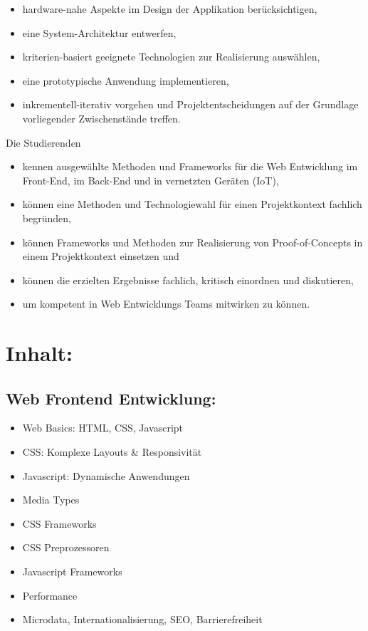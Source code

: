\begin{itemize}
\tightlist
\item
  hardware-nahe Aspekte im Design der Applikation berücksichtigen,
\item
  eine System-Architektur entwerfen,
\item
  kriterien-basiert geeignete Technologien zur Realisierung auswählen,
\item
  eine prototypische Anwendung implementieren,
\item
  inkrementell-iterativ vorgehen und Projektentscheidungen auf der
  Grundlage vorliegender Zwischenstände treffen.
\end{itemize}

Die Studierenden

\begin{itemize}
\tightlist
\item
  kennen ausgewählte Methoden und Frameworks für die Web Entwicklung im
  Front-End, im Back-End und in vernetzten Geräten (IoT),
\item
  können eine Methoden und Technologiewahl für einen Projektkontext
  fachlich begründen,
\item
  können Frameworks und Methoden zur Realisierung von Proof-of-Concepts
  in einem Projektkontext einsetzen und
\item
  können die erzielten Ergebnisse fachlich, kritisch einordnen und
  diskutieren,
\item
  um kompetent in Web Entwicklungs Teams mitwirken zu können.
\end{itemize}

\section*{Inhalt:}\label{inhalt-26}

\subsection*{Web Frontend
Entwicklung:}\label{web-frontend-entwicklung-1}

\begin{itemize}
\tightlist
\item
  Web Basics: HTML, CSS, Javascript
\item
  CSS: Komplexe Layouts \& Responsivität
\item
  Javascript: Dynamische Anwendungen
\item
  Media Types
\item
  CSS Frameworks
\item
  CSS Preprozessoren
\item
  Javascript Frameworks
\item
  Performance
\item
  Microdata, Internationalisierung, SEO, Barrierefreiheit
\end{itemize}

